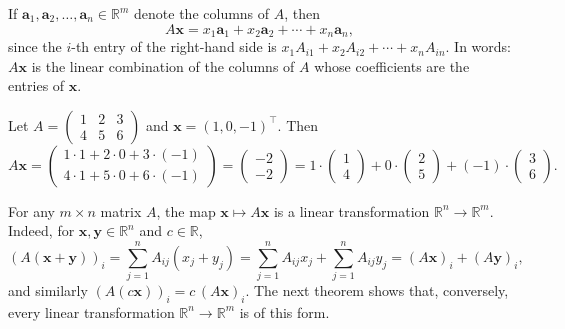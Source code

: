 \begin{remark}\label{L1-rem:columns}
    If $\mathbf{a}_1, \mathbf{a}_2, \ldots, \mathbf{a}_n \in \mathbb{R}^m$ denote the columns of $A$, then
    \[A\mathbf{x} = x_1 \mathbf{a}_1 + x_2 \mathbf{a}_2 + \cdots + x_n \mathbf{a}_n,\]
    since the $i$-th entry of the right-hand side is $x_1 A_{i1} + x_2 A_{i2} + \cdots + x_n A_{in}$. In words: $A\mathbf{x}$ is the linear combination of the columns of $A$ whose coefficients are the entries of $\mathbf{x}$.
\end{remark}

\begin{example}\label{L1-ex:matvec}
    Let $A = \begin{pmatrix} 1 & 2 & 3 \\ 4 & 5 & 6 \end{pmatrix}$ and $\mathbf{x} = (1, 0, -1)^\top$. Then
    \[A\mathbf{x} = \begin{pmatrix}
        1 \cdot 1 + 2 \cdot 0 + 3 \cdot (-1) \\
        4 \cdot 1 + 5 \cdot 0 + 6 \cdot (-1)
    \end{pmatrix} = \begin{pmatrix}
        -2 \\
        -2
    \end{pmatrix} = 1 \cdot \begin{pmatrix} 1 \\ 4 \end{pmatrix} + 0 \cdot \begin{pmatrix} 2 \\ 5 \end{pmatrix} + (-1) \cdot \begin{pmatrix} 3 \\ 6 \end{pmatrix}.\]
\end{example}

\begin{remark}
    For any $m \times n$ matrix $A$, the map $\mathbf{x} \mapsto A\mathbf{x}$ is a linear transformation $\mathbb{R}^n \to \mathbb{R}^m$. Indeed, for $\mathbf{x}, \mathbf{y} \in \mathbb{R}^n$ and $c \in \mathbb{R}$,
    \[(A(\mathbf{x} + \mathbf{y}))_i = \sum_{j=1}^n A_{ij}(x_j + y_j) = \sum_{j=1}^n A_{ij} x_j + \sum_{j=1}^n A_{ij} y_j = (A\mathbf{x})_i + (A\mathbf{y})_i,\]
    and similarly $(A(c\mathbf{x}))_i = c\,(A\mathbf{x})_i$. The next theorem shows that, conversely, every linear transformation $\mathbb{R}^n \to \mathbb{R}^m$ is of this form.
\end{remark}

